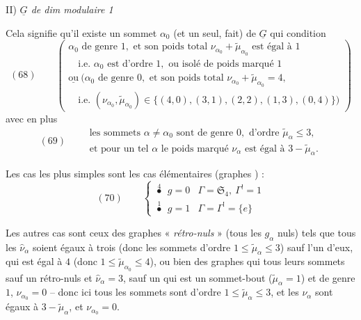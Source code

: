 \documentclass[11pt,a4paper]{article}
\begin{document}
II) \emph{$\underline{G}$ de dim modulaire 1}

Cela signifie qu'il existe un sommet $\alpha_0$ (et un seul,  fait) de $\underline{G}$ qui   condition
\[
(68)\qquad
\left(
\begin{array}{l}
\alpha_0 \text{ de genre } 1, \text{ et son poids total } \nu_{\alpha_0} + \tilde{\mu}_{\alpha_0} \text{ est égal à } 1 \\
\quad \text{i.e.\ } \alpha_0 \text{ est d'ordre } 1, \text{ ou isolé de poids marqué } 1 \\
\underline{\text{ou}} \ \bigl(\alpha_0 \text{ de genre } 0, \text{ et son poids total } \nu_{\alpha_0} + \tilde{\mu}_{\alpha_0} = 4, \\
\quad \text{i.e.\ } (\nu_{\alpha_0}, \tilde{\mu}_{\alpha_0}) \in \{(4,0), (3,1), (2,2), (1,3), (0,4)\}\bigr)
\end{array}
\right)
\]
avec en plus
\[
(69)\qquad
\begin{array}{l}
\text{les sommets } \alpha \neq \alpha_0 \text{ sont de genre } 0, \text{ d'ordre } \tilde{\mu}_\alpha \leqslant 3, \\
\text{et pour un tel } \alpha \text{ le poids marqué } \nu_\alpha \text{ est égal à } 3 - \tilde{\mu}_\alpha .
\end{array}
\]


Les cas les plus simples sont les cas élémentaires (graphes \struck{\ill{}} ) :
\[
(70)\qquad
\left\{
\begin{array}{ll}
\overset{4}{\bullet} \ \ g = 0 & \Gamma = \mathfrak{S}_4, \ \Gamma^{!} = 1 \\[6pt]
\overset{1}{\bullet} \ \ g = 1 & \Gamma = \Gamma^{!} = \{e\}
\end{array}
\right.
\]

Les autres cas sont ceux des graphes « \emph{rétro-nuls} » (tous les $g_\alpha$ nuls) tels que tous les $\hat{\nu}_\alpha$ soient égaux à trois (donc les sommets d'ordre $1 \leqslant \tilde{\mu}_\alpha \leqslant 3$)  sauf l'un d'eux, qui est égal à $4$ (donc $1 \leqslant \tilde{\mu}_{\alpha_0} \leqslant 4$), ou bien des graphes qui  tous leurs sommets sauf un rétro-nuls et $\hat{\nu}_\alpha = 3$,  sauf un  qui est un sommet-bout ($\tilde{\mu}_\alpha = 1$) et de genre $1$, $\nu_{\alpha_0} = 0$ -- donc ici tous les sommets sont d'ordre $1 \leqslant \tilde{\mu}_\alpha \leqslant 3$, et les $\nu_\alpha$  sont égaux à $3 - \tilde{\mu}_\alpha$,  et $\nu_{\alpha_0} = 0$.
\end{document}

